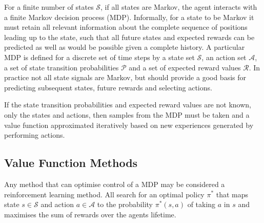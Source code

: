
For a finite number of states $\mathscr{S}$, if all states are Markov, the
agent interacts with a finite Markov decision process (MDP).  Informally,
for a state to be Markov it must retain all relevant information about the
complete sequence of positions leading up to the state, such that all future
states and expected rewards can be predicted as well as would be possible given
a complete history.  A particular MDP is defined for a discrete set of time
steps by a state set $\mathscr{S}$, an action set $\mathscr{A}$, a set of state
transition probabilities $\mathscr{P}$ and a set of expected reward values
$\mathscr{R}$.
In practice not all state signals are Markov, but should provide a good basis
for predicting subsequent states, future rewards and selecting actions.

If the state transition probabilities and expected reward values are not known,
only the states and actions, then samples from the MDP must be taken and a value
function approximated iteratively based on new experiences generated by
performing actions.

\subsection{Value Function Methods}
\label{sec:valuebased}
Any method that can optimise control of a MDP may be considered a reinforcement
learning method.  All search for an optimal policy $\pi^*$ that maps state
$s \in \mathscr{S}$ and action $a \in \mathscr{A}$ to the probability
$\pi^*(s,a)$ of taking $a$ in $s$ and maximises the sum of rewards over the
agents lifetime.

